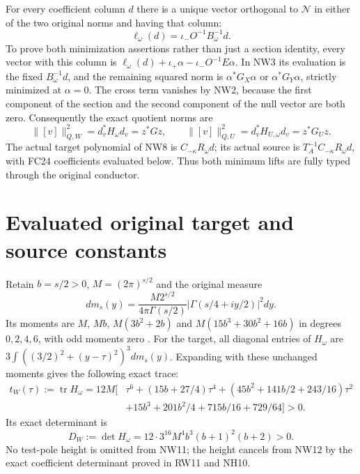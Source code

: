 \documentclass[11pt]{article}
\newcommand{\tr}{\operatorname{tr}}
\begin{document}
For every coefficient column $d$ there is a unique vector
orthogonal to $\mathcal N$ in either of the two original
norms and having that column:
\[
 \ell_\omega(d)=\iota_-O^{-1}B_\omega^{-1}d.
 \tag{NW8}
\]
To prove both minimization assertions rather than just a
section identity, every vector with this column is
$\ell_\omega(d)+\iota_+\alpha-\iota_-O^{-1}E\alpha$.
In NW3 its evaluation is the fixed $B_\omega^{-1}d$,
and the remaining squared norm is $\alpha^*G_X\alpha$
or $\alpha^*G_Y\alpha$, strictly minimized at $\alpha=0$.
The cross term vanishes by NW2, because the first component
of the section and the second component of the null vector
are both zero. Consequently the exact quotient norms are
\[
 \|[v]\|_{Q,W}^2=d_v^*H_\omega d_v=z^*Gz,
 \qquad
 \|[v]\|_{Q,U}^2=d_v^*H_{U,\omega}d_v=z^*G_Uz.
 \tag{NW9}
\]
The actual target polynomial of NW8 is
$C_{-\kappa}R_\omega d$; its actual source is
$T_A^{-1}C_{-\kappa}R_\omega d$, with FC24 coefficients
evaluated below. Thus both minimum lifts are fully typed
through the original conductor.

\section{Evaluated original target and source constants}
Retain $b=s/2>0$, $M=(2\pi)^{s/2}$ and the original
measure
\[
 dm_s(y)=\frac{M2^{s/2}}{4\pi\Gamma(s/2)}
                 |\Gamma(s/4+iy/2)|^2dy.
 \tag{NW10}
\]
Its moments are $M$, $Mb$, $M(3b^2+2b)$ and
$M(15b^3+30b^2+16b)$ in degrees $0,2,4,6$, with
odd moments zero \cite{WCF,NH}. For the target, all diagonal
entries of $H_\omega$ are
$3\int((3/2)^2+(y-\tau)^2)^3dm_s(y)$. Expanding with
these unchanged moments gives the following exact trace:
\[
\begin{aligned}
 t_W(\tau):=\tr H_\omega=12M\big[&\tau^6+(15b+27/4)\tau^4
 +(45b^2+141b/2+243/16)\tau^2\\
 &+15b^3+201b^2/4+715b/16+729/64\big]>0.
\end{aligned}\tag{NW11}
\]
Its exact determinant is
\[
 D_W:=\det H_\omega=12\cdot3^{16}M^4b^3(b+1)^2(b+2)>0.
 \tag{NW12}
\]
No test-pole height is omitted from NW11; the height cancels
from NW12 by the exact coefficient determinant proved in
RW11 and NH10.
\end{document}
